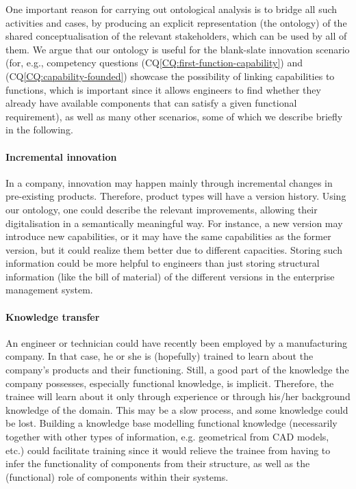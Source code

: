 \documentclass[sw]{iosart2x}
\newcommand{\CQLabel}{\textrm{CQ}}
\newcommand{\refCQ}[1]{({\CQLabel}\ref{#1})}
\newcommand{\TODO}[1]{{%
}}
\begin{document}
One important reason for carrying out ontological analysis is to bridge all such activities and cases, by producing an explicit representation (the ontology) of the shared conceptualisation of the relevant stakeholders, which can be used by all of them.
We argue that our ontology is useful for the blank-slate innovation scenario (for, e.g., competency questions \refCQ{CQ:first-function-capability} and \refCQ{CQ:capability-founded} showcase the possibility of linking capabilities to functions, which is important since it allows engineers to find whether they already have available components that can satisfy a given functional requirement), as well as many other scenarios, some of which we describe briefly in the following. 

\paragraph{Incremental innovation} In a company, innovation may happen mainly through incremental changes in pre-existing products. 
Therefore, product types will have a version history. %
Using our ontology, one could describe %
the relevant improvements, allowing their digitalisation in a semantically meaningful way. 
For instance, a new version may introduce new capabilities, or it may have the same capabilities as the former version, but it could realize them better due to different capacities. 
Storing such information could be more helpful to engineers than just storing structural information (like the bill of material) of the different versions in the enterprise management system.

\paragraph{Knowledge transfer} An engineer or technician could have recently been employed by a manufacturing company. 
In that case, he or she is (hopefully) trained to learn about the company's products and their functioning. 
Still, a good part of the knowledge the company possesses, especially functional knowledge, is implicit. 
Therefore, the trainee will learn about it only through experience or through his/her background knowledge of the domain. 
This may be a slow process, and some knowledge could be lost. 
Building a knowledge base modelling functional knowledge (necessarily together with other types of information, e.g. geometrical from CAD models, etc.) could facilitate training since it would relieve the trainee from having to infer the functionality of components from their structure, as well as the (functional) role of components within their systems. 
\end{document}
